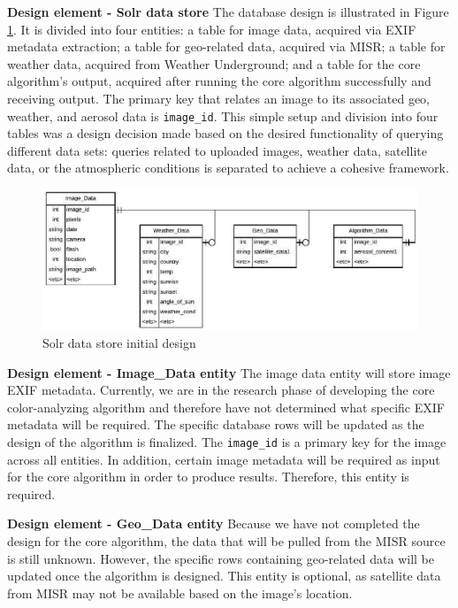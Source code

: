 \documentclass[onecolumn, draftclsnofoot,10pt, compsoc]{IEEEtran}
\begin{document}
\begin{flushleft}
\medskip

\textbf{Design element - Solr data store} The database design is illustrated in Figure \ref{fig:mysql}. It is divided into four entities: a table for image data, acquired via EXIF metadata extraction; a table for geo-related data, acquired via MISR; a table for weather data, acquired from Weather Underground; and a table for the core algorithm’s output, acquired after running the core algorithm successfully and receiving output. The primary key that relates an image to its associated geo, weather, and aerosol data is \texttt{image\_id}. This simple setup and division into four tables was a design decision made based on the desired functionality of querying different data sets: queries related to uploaded images, weather data, satellite data, or the atmospheric conditions is separated to achieve a cohesive framework.


\begin{figure}[H]
\centering
  \includegraphics[width=\textwidth]{mysql.eps}
  \caption{Solr data store initial design}
  \label{fig:mysql}
\end{figure}


\textbf{Design element - Image\_Data entity} The image data entity will store image EXIF metadata. Currently, we are in the research phase of developing the core color-analyzing algorithm and therefore have not determined what specific EXIF metadata will be required. The specific database rows will be updated as the design of the algorithm is finalized. The \texttt{image\_id} is a primary key for the image across all entities. In addition, certain image metadata will be required as input for the core algorithm in order to produce results. Therefore, this entity is required.

\medskip

\textbf{Design element - Geo\_Data entity} Because we have not completed the design for the core algorithm, the data that will be pulled from the MISR source is still unknown. However, the specific rows containing geo-related data will be updated once the algorithm is designed. This entity is optional, as satellite data from MISR may not be available based on the image’s location. 


\end{flushleft}
\end{document}
